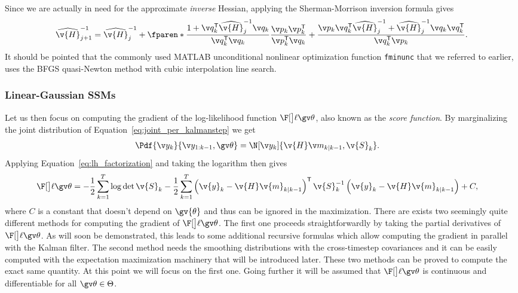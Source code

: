 Since we are actually in need for the approximate \emph{inverse} Hessian,
applying the Sherman-Morrison inversion formula gives
\begin{align}
	\widehat{\v{H}}_{j+1}^{-1}=\widehat{\v{H}}_{j}^{-1}+\fparen*{\frac{1+\q_k^\tr\widehat{\v{H}}_{j}^{-1}\q_k}{\q_k^\tr\q_k}}\frac{\p_k\p_k^\tr}{\p_k^\tr\q_k}+
	\frac{\p_k\q_k^\tr\widehat{\v{H}}^{-1}_{j}+\widehat{\v{H}}^{-1}_{j}\q_k\q_k^\tr}{\q_k^\tr\p_k}.
\end{align}
It should be pointed that the commonly used MATLAB unconditional nonlinear
optimization function \texttt{fminunc} that we referred to earlier, uses 
the BFGS quasi-Newton method with cubic interpolation line search.

\subsubsection{Linear-Gaussian SSMs}\label{sec:grad_LGSSM}

Let us then focus on computing the gradient of the
log-likelihood function $\lLH$, also known as the \emph{score function}.
By marginalizing the joint distribution of Equation~\eqref{eq:joint_per_kalmanstep}
we get 
\begin{align}
	\Pdf{\y_k}{\y_{1:k-1},\Th}&=\N[\yk]{\v{H}\m_{k|k-1},\v{S}_k }.
\end{align}
Applying Equation~\eqref{eq:lh_factorization} and taking the logarithm then gives
\begin{align}
	\lLH&=-\frac{1}{2}\sum_{k=1}^T\log\det{\v{S}_k}
	-\frac{1}{2}\sum_{k=1}^T\left(\v{y}_k-\v{H}\v{m}_{k|k-1}\right)^\tr\v{S}_{k}^{-1}\left(\v{y}_k-\v{H}\v{m}_{k|k-1}\right)+C,
	\label{eq:logLH}
\end{align}
where $C$ is a constant that doesn't depend on $\gv{\theta}$ and thus can
be ignored in the maximization.
There are exists two seemingly quite different methods for computing
the gradient of $\lLH$. The first one proceeds straightforwardly by taking the
partial derivatives of $\lLH$. As will soon be demonstrated, this leads
to some additional recursive formulas which allow computing
the gradient in parallel with the Kalman filter. The second method needs
the smoothing distributions with the cross-timestep covariances
and it can be easily computed with the expectation maximization machinery
that will be introduced later. These two methods can be proved to compute
the exact same quantity. At this point we will focus on the first one. Going further
it will be assumed that $\lLH$ is continuous and differentiable for all $\Th\in\Theta$.

